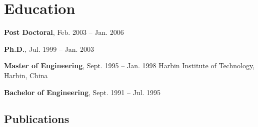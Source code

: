 \documentclass[line,10pt,final]{res}
\begin{document}
\begin{resume}
{}


\section{\sc Education}


{\bf Post Doctoral}, Feb. 2003 -- Jan. 2006 

{\bf Ph.D.}, Jul. 1999 -- Jan. 2003 

{\bf Master of Engineering}, Sept. 1995 -- Jan. 1998 \newline
{Harbin Institute of Technology, Harbin, China
}

{\bf Bachelor of Engineering}, Sept. 1991 -- Jul. 1995 




\begin{enumerate}

\section{\sc Publications}


\end{enumerate}
\end{resume}
\end{document}
